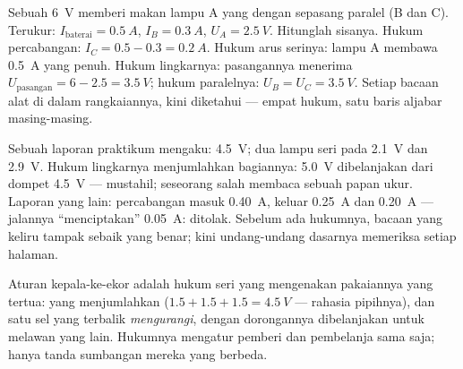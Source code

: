\begin{example}\label{ex:g8:circuit-laws:worked}
Sebuah  \qty{6}{V} memberi makan lampu A yang 
dengan sepasang  paralel (B dan C). Terukur:
$I_{\text{baterai}} = \qty{0.5}{A}$,
$I_B = \qty{0.3}{A}$, $U_A = \qty{2.5}{V}$. Hitunglah sisanya.
Hukum percabangan: $I_C = 0.5 - 0.3 = \qty{0.2}{A}$. Hukum arus
serinya: lampu A membawa \qty{0.5}{A} yang penuh. Hukum 
lingkarnya: pasangannya menerima $U_{\text{pasangan}} = 6 - 2.5 = \qty{3.5}{V}$;
hukum  paralelnya: $U_B = U_C = \qty{3.5}{V}$. Setiap bacaan
alat di dalam rangkaiannya, kini diketahui --- empat hukum, satu baris
aljabar masing-masing.
\end{example}

\begin{example}\label{ex:g8:circuit-laws:liedetector}
Sebuah laporan praktikum mengaku:  \qty{4.5}{V}; dua lampu seri
pada \qty{2.1}{V} dan \qty{2.9}{V}. Hukum lingkarnya menjumlahkan
bagiannya: \qty{5.0}{V} dibelanjakan dari dompet \qty{4.5}{V} ---
mustahil; seseorang salah membaca sebuah papan ukur. Laporan yang
lain: percabangan masuk \qty{0.40}{A},  keluar \qty{0.25}{A} dan
\qty{0.20}{A} ---  jalannya ``menciptakan'' \qty{0.05}{A}:
ditolak. Sebelum ada hukumnya, bacaan yang keliru tampak sebaik yang
benar; kini undang-undang dasarnya memeriksa setiap halaman.
\end{example}

\begin{remark}\label{rem:g8:circuit-laws:batteries}
Aturan kepala-ke-ekor adalah hukum  seri yang mengenakan
pakaiannya yang tertua:  yang  menjumlahkan
 ($1.5 +
1.5 + 1.5 = \qty{4.5}{V}$ --- rahasia  pipihnya), dan satu sel
yang terbalik \emph{mengurangi}, dengan dorongannya dibelanjakan untuk
melawan yang lain. Hukumnya mengatur pemberi dan pembelanja sama saja;
hanya tanda sumbangan mereka yang berbeda.
\end{remark}

